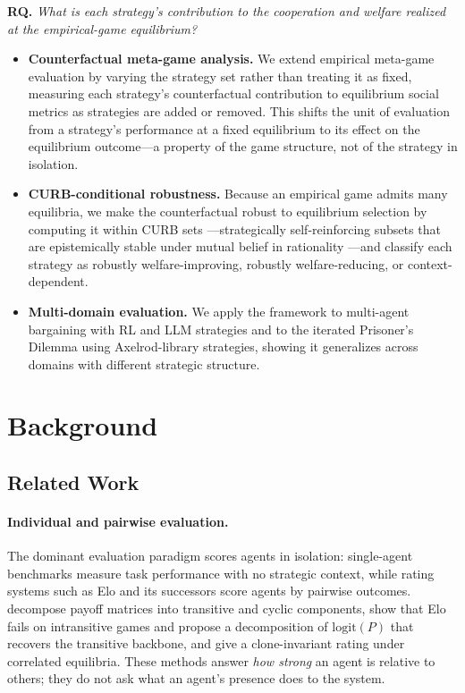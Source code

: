 \documentclass[sigconf,anonymous]{aamas}
\begin{document}
\textbf{RQ.} \textit{What is each strategy's contribution to the cooperation and welfare realized at the empirical-game equilibrium?}

\begin{itemize}
\item \textbf{Counterfactual meta-game analysis.} We extend empirical meta-game evaluation by varying the strategy set rather than treating it as fixed, measuring each strategy's counterfactual contribution to equilibrium social metrics as strategies are added or removed. This shifts the unit of evaluation from a strategy's performance at a fixed equilibrium to its effect on the equilibrium outcome---a property of the game structure, not of the strategy in isolation.                                                                                      
\item \textbf{CURB-conditional robustness.} Because an empirical game admits many equilibria, we make the counterfactual robust to equilibrium selection by computing it within CURB sets \citep{Basu1991StrategySC}---strategically self-reinforcing subsets that are epistemically stable under mutual belief in rationality \citep{asheim2016epistemically}---and classify each strategy as robustly welfare-improving, robustly welfare-reducing, or context-dependent.

\item \textbf{Multi-domain evaluation.} We apply the framework to multi-agent bargaining with RL and LLM strategies \citep{smithline2025measuring} and to the iterated Prisoner's Dilemma using Axelrod-library strategies, showing it generalizes across domains with different strategic structure.                                
\end{itemize}

\section{Background}

\subsection{Related Work}

\paragraph{Individual and pairwise evaluation.} The dominant evaluation paradigm scores agents in isolation: single-agent benchmarks measure task performance with no strategic context, while rating systems such as Elo and its successors score agents by pairwise outcomes. \citet{Balduzzi2018ReevaluatingE} decompose payoff matrices into transitive and cyclic components, \citet{bertrand2023limitations} show that Elo fails on intransitive games and propose a decomposition of $\mathrm{logit}(P)$ that recovers the transitive backbone, and \citet{marris2025deviation} give a clone-invariant rating under correlated equilibria. These methods answer \emph{how strong} an agent is relative to others; they do not ask what an agent's presence does to the system.
\end{document}
